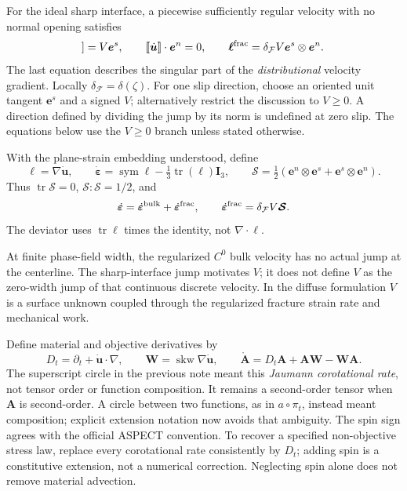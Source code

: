 \documentclass[10pt,letterpaper]{article}
\newcommand{\F}{\mathcal F}
\newcommand{\SSS}{\bm{\mathcal S}}
\newcommand{\vel}{\dot{\bm u}}
\newcommand{\erate}{\dot{\bm\varepsilon}}
\newcommand{\dt}{D_t}
\newcommand{\rr}{\mathring}
\newcommand{\tr}{\operatorname{tr}}
\newcommand{\sym}{\operatorname{sym}}
\newcommand{\skw}{\operatorname{skw}}
\begin{document}
For the ideal sharp interface, a piecewise sufficiently regular velocity with no normal opening satisfies
\begin{equation}
 [\![\vel]\!]=V\bm e^s,\qquad [\![\vel]\!]\cdot\bm e^n=0,\qquad
 \bm\ell^{\rm frac}=\delta_{\F}V\bm e^s\otimes\bm e^n.
\end{equation}
The last equation describes the singular part of the \emph{distributional} velocity gradient. Locally $\delta_{\F}=\delta(\zeta)$. For one slip direction, choose an oriented unit tangent $\bm e^s$ and a signed $V$; alternatively restrict the discussion to $V\geq0$. A direction defined by dividing the jump by its norm is undefined at zero slip. The equations below use the $V\geq0$ branch unless stated otherwise.

With the plane-strain embedding understood, define
\begin{equation}
 \bm\ell=\nabla\vel,\qquad
 \erate=\sym\bm\ell-\tfrac13\tr(\bm\ell)\bm I_3,\qquad
 \SSS=\tfrac12(\bm e^n\otimes\bm e^s+\bm e^s\otimes\bm e^n).
\end{equation}
Thus $\tr\SSS=0$, $\SSS:\SSS=1/2$, and
\begin{equation}
 \erate=\erate^{\rm bulk}+\erate^{\rm frac},\qquad
 \erate^{\rm frac}=\delta_{\F}V\SSS.
\end{equation}
The deviator uses $\tr\bm\ell$ times the identity, not $\nabla\cdot\bm\ell$.

At finite phase-field width, the regularized $C^0$ bulk velocity has no actual jump at the centerline. The sharp-interface jump motivates $V$; it does not define $V$ as the zero-width jump of that continuous discrete velocity. In the diffuse formulation $V$ is a surface unknown coupled through the regularized fracture strain rate and mechanical work.

Define material and objective derivatives by
\begin{equation}
 \dt=\partial_t+\vel\cdot\nabla,\qquad
 \bm W=\skw\nabla\vel,\qquad
 \boxed{\rr{\bm A}=\dt\bm A+\bm A\bm W-\bm W\bm A.} \label{eq:jaumann}
\end{equation}
The superscript circle in the previous note meant this \emph{Jaumann corotational rate}, not tensor order or function composition. It remains a second-order tensor when $\bm A$ is second-order. A circle between two functions, as in $a\circ\pi_t$, instead meant composition; explicit extension notation now avoids that ambiguity. The spin sign agrees with the official ASPECT convention. To recover a specified non-objective stress law, replace every corotational rate consistently by $\dt$; adding spin is a constitutive extension, not a numerical correction. Neglecting spin alone does not remove material advection.
\end{document}
